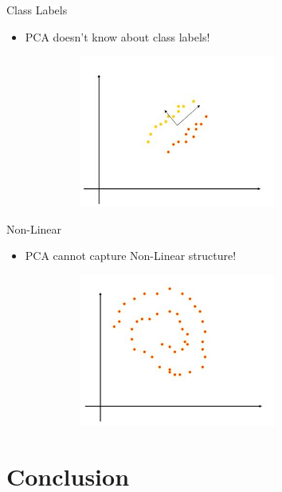 \documentclass[serif, aspectratio=169]{beamer}
\begin{document}
\begin{frame}{Class Labels}
    \begin{itemize}
        \item PCA doesn’t know about class labels!
        \begin{figure}[htpb]
            \begin{center}
                \includegraphics[width=8cm, height=5cm]{pic/labels.JPG}
            \end{center}
        \end{figure}
    \end{itemize}
\end{frame}


\begin{frame}{Non-Linear}
    \begin{itemize}
        \item PCA cannot capture Non-Linear structure!
        \begin{figure}[htpb]
            \begin{center}
                \includegraphics[width=8cm, height=5cm]{pic/nolinear.JPG}
            \end{center}
        \end{figure}
    \end{itemize}
\end{frame}

\section{Conclusion}
\end{document}
